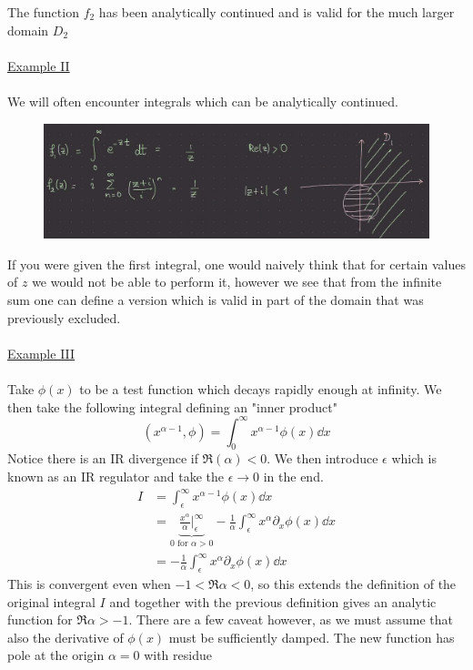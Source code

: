 \documentclass[a4paper,12pt]{article}
\begin{document}
The function $f_2$ has been analytically continued and is valid for the much larger domain $D_2$\\\\
\underline{Example II}\\\\
We will often encounter integrals which can be analytically continued.
\begin{figure}[H]
	\centering
	\includegraphics[width=0.8\linewidth]{19}
	\caption{}
	\label{fig:4}
\end{figure}
If you were given the first integral, one would naively think that for certain values of $z$ we would not be able to perform it, however we see that from the infinite sum one can define a version which is valid in part of the domain that was previously excluded.\\\\
\underline{Example III}\\\\
Take $\phi(x)$ to be a test function which decays rapidly enough at infinity. We then take the following integral defining an "inner product"
\begin{equation}
(x^{\alpha-1},\phi)=\int_0^\infty x^{\alpha-1}\phi(x)\dd x
\end{equation}
Notice there is an IR divergence if $\Re(\alpha)<0$. We then introduce $\epsilon$ which is known as an IR regulator and take the $\epsilon\to 0$ in the end.
\begin{equation}
\begin{aligned}
I&=\int_\epsilon^\infty x^{\alpha-1}\phi(x)\dd x\\
&=\underbrace{\frac{x^\alpha}{\alpha}\big|^{\infty}_\epsilon}_{0 \text{ for } \alpha > 0}
-\frac{1}{\alpha}\int_\epsilon^\infty x^{\alpha}\partial_x\phi(x)\dd x\\
&=-\frac{1}{\alpha}\int_\epsilon^\infty x^{\alpha}\partial_x\phi(x)\dd x
\end{aligned}
\end{equation}
This is convergent even when $-1<\Re \alpha  <0$, so this extends the definition of the original integral $I$ and together with the previous definition gives an analytic function for $\Re \alpha >-1$. There are a few caveat however, as we must assume that also the derivative of $\phi(x)$ must be sufficiently damped. The new function has pole at the origin $\alpha=0$ with residue
\end{document}
